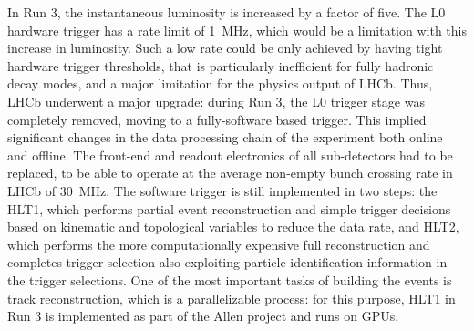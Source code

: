 In Run 3, the instantaneous luminosity is increased by a factor of five. The L0 hardware trigger has a rate limit of \SI{1}{\mega\hertz}, which would be a limitation with this increase in luminosity.
Such a low rate could be only achieved by having tight hardware trigger thresholds, that is particularly inefficient for fully hadronic decay modes, and a major limitation for the physics output of LHCb.
Thus, LHCb underwent a major upgrade: during Run 3, the L0 trigger stage was completely removed, moving to a fully-software based trigger. This implied significant changes in the data processing chain of the experiment both online and offline.
The front-end and readout electronics of all sub-detectors had to be replaced, to be able to operate at the average non-empty bunch crossing rate in LHCb of \SI{30}{\mega\hertz}.
The software trigger is still implemented in two steps: the HLT1, which performs partial event reconstruction and simple trigger decisions based on kinematic and topological variables to reduce the data rate, and HLT2, which performs the more computationally expensive full reconstruction and completes trigger selection also exploiting particle identification information in the trigger selections. One of the most important tasks of building the events is track reconstruction, which is a parallelizable process: for this purpose, HLT1 in Run 3 is implemented as part of the Allen project and runs on GPUs. %

